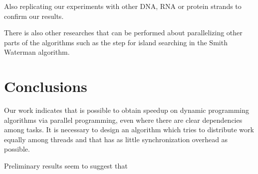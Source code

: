 \documentclass[journal]{IEEEtran}
\begin{document}
Also replicating our experiments with other DNA, RNA or protein strands to confirm our results. 

There is also other researches that can be performed about parallelizing other parts of the algorithms such as the step for island searching in the Smith Waterman algorithm.

\section{Conclusions}

Our work indicates that is possible to obtain speedup on dynamic programming algorithms via parallel programming, even where there are clear dependencies among tasks. It is necessary to design an algorithm which tries to distribute work equally among threads and that has as little synchronization overhead as possible.

Preliminary results seem to suggest that 





\ifCLASSOPTIONcaptionsoff
  \newpage
\fi

%
%
\end{document}
